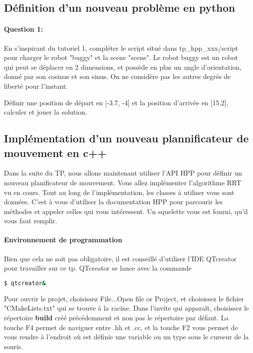\documentclass {article}
\begin{document}
\subsection{D\'efinition d'un nouveau probl\`eme en python}
\paragraph {Question 1:}
En s'inspirant du tutoriel 1, compl\'eter le script situ\'e dans tp\_hpp\_xxx/script pour 
charger le robot "buggy" et la scene "scene".
Le robot buggy est un robot qui peut se d\'eplacer en 2 dimensions, et poss\`ede en plus un angle
d'orientation, donn\'e par son cosinus et son sinus. On ne consid\`ere pas les autres degr\'es de
libert\'e pour l'instant.

D\'efinir une position de d\'epart en [-3.7, -4] et la position d'arriv\'ee en [15,2],
calculer et jouer la solution.

\subsection{Impl\'ementation d'un nouveau plannificateur de mouvement en c++}
Dans la suite du TP, nous allons maintenant utiliser l'API HPP pour d\'efinir un nouveau planificateur de mouvement.
Vous allez impl\'ementer l'algorithme RRT vu en cours.
Tout au long de l'impl\'ementation, les classes \`a utiliser vous sont donn\'ees.
C'est \`a vous d'utiliser la documentation HPP pour parcourir les m\'ethodes et appeler celles qui vous int\'eressent.
Un squelette vous est fourni, qu'il vous faut remplir.

\paragraph{Environnement de programmation}
Bien que cela ne soit pas obligatoire, il est conseill\'e d'utiliser l'IDE QTcreator pour travailler sur ce tp.
QTcreator se lance avec la commande 
\begin{lstlisting}[language=bash]
  $ qtcreator&
\end{lstlisting}

Pour ouvrir le projet, choisissez File...Open file or Project, et choisissez le fichier "CMakeLists.txt"
qui se trouve \`a la racine. Dans l'invite qui appara\^it, choisissez le r\'epertoire \textbf{build} créé pr\'ec\'edemment et non
pas le r\'epertoire par d\'efaut. La touche F4 permet de naviguer entre .hh et .cc, et la touche F2 vous 
permet de vous rendre \`a l'endroit o\`u est d\'efinie une variable ou un type sous le curseur de la souris.
\end{document}
